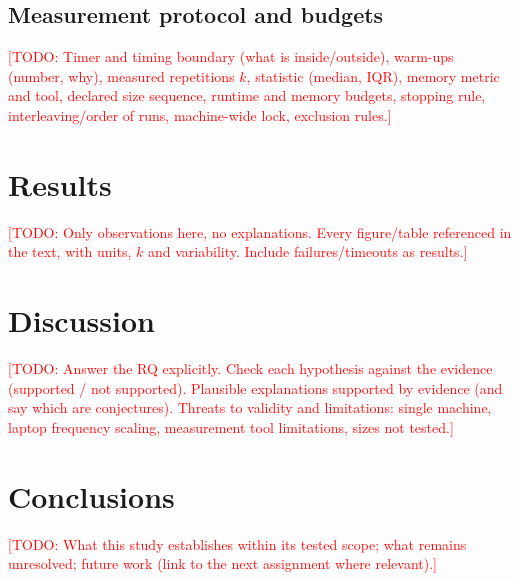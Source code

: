 \documentclass[conference,a4paper]{IEEEtran}
\newcommand{\todo}[1]{\textcolor{red}{[TODO: #1]}}
\begin{document}
{\subsection{Measurement protocol and budgets}
\todo{Timer and timing boundary (what is inside/outside), warm-ups (number, why), measured repetitions $k$,
statistic (median, IQR), memory metric and tool, declared size sequence, runtime and memory budgets,
stopping rule, interleaving/order of runs, machine-wide lock, exclusion rules.}

\section{Results}
\label{sec:results}
\todo{Only observations here, no explanations. Every figure/table referenced in the text, with units,
$k$ and variability. Include failures/timeouts as results.}


\section{Discussion}
\label{sec:discussion}
\todo{Answer the RQ explicitly. Check each hypothesis against the evidence (supported / not supported).
Plausible explanations supported by evidence (and say which are conjectures). Threats to validity and
limitations: single machine, laptop frequency scaling, measurement tool limitations, sizes not tested.}

\section{Conclusions}
\label{sec:conclusions}
\todo{What this study establishes within its tested scope; what remains unresolved; future work
(link to the next assignment where relevant).}

}
\end{document}
